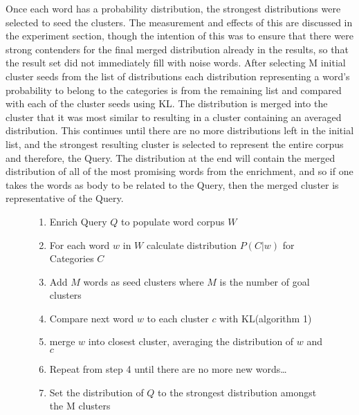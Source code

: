 \documentclass[letterpaper]{article}
\begin{document}
Once each word has a probability distribution, the strongest distributions were selected to seed the clusters. The measurement and effects of this are discussed in the experiment section, though the intention of this was to ensure that there were strong contenders for the final merged distribution already in the results, so that the result set did not immediately fill with noise words. 
After selecting M initial cluster seeds from the list of distributions each distribution representing a word's probability to belong to the categories is from the remaining list and compared with each of the cluster seeds using KL. The distribution is merged into the cluster that it was most similar to resulting in a cluster containing an averaged distribution. This continues until there are no more distributions left in the initial list, and the strongest resulting cluster is selected to represent the entire corpus and therefore, the Query. 
The distribution at the end will contain the merged distribution of all of the most promising words from the enrichment, and so if one takes the words as body to be related to the Query, then the merged cluster is representative of the Query. 
\begin{figure}
\begin{enumerate}
	
	\item  Enrich Query $Q$ to populate word corpus $W$
	\item  For each word $w$ in $W$ calculate distribution $P(C|w)$ for Categories $C$
	\item  Add $M$ words as seed clusters where $M$ is the number of goal clusters
	\item  Compare next word $w$ to each cluster $c$ with KL(algorithm 1)
	\item  merge $w$ into closest cluster, averaging the distribution of $w$ and $c$
	\item  Repeat from step 4 until there are no more new words\ldots
	\item  Set the distribution of $Q$ to the strongest distribution amongst the M clusters
\end{enumerate}
\end{figure}
\end{document}
